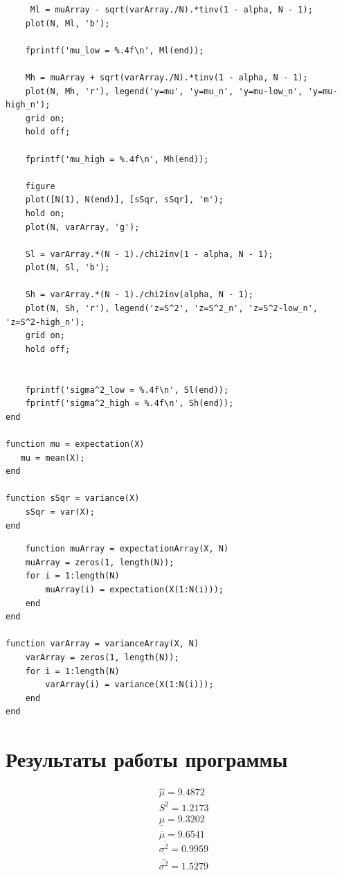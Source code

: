 \newpage
\begin{lstlisting}
     Ml = muArray - sqrt(varArray./N).*tinv(1 - alpha, N - 1);
    plot(N, Ml, 'b');

    fprintf('mu_low = %.4f\n', Ml(end));
    
    Mh = muArray + sqrt(varArray./N).*tinv(1 - alpha, N - 1);
    plot(N, Mh, 'r'), legend('y=mu', 'y=mu_n', 'y=mu-low_n', 'y=mu-high_n');
    grid on;
    hold off;
    
    fprintf('mu_high = %.4f\n', Mh(end));

    figure
    plot([N(1), N(end)], [sSqr, sSqr], 'm');
    hold on;
    plot(N, varArray, 'g');
    
    Sl = varArray.*(N - 1)./chi2inv(1 - alpha, N - 1);
    plot(N, Sl, 'b');
    
    Sh = varArray.*(N - 1)./chi2inv(alpha, N - 1);
    plot(N, Sh, 'r'), legend('z=S^2', 'z=S^2_n', 'z=S^2-low_n', 'z=S^2-high_n');
    grid on;
    hold off;

	
    fprintf('sigma^2_low = %.4f\n', Sl(end));
    fprintf('sigma^2_high = %.4f\n', Sh(end));
end

function mu = expectation(X)
   mu = mean(X);
end

function sSqr = variance(X)
    sSqr = var(X);
end
\end{lstlisting}
\newpage
\begin{lstlisting}
    function muArray = expectationArray(X, N)
    muArray = zeros(1, length(N));
    for i = 1:length(N)
        muArray(i) = expectation(X(1:N(i)));
    end
end

function varArray = varianceArray(X, N)
    varArray = zeros(1, length(N));
    for i = 1:length(N)
        varArray(i) = variance(X(1:N(i)));
    end
end
\end{lstlisting}

\section{Результаты работы программы}

\begin{equation*}
    \begin{split}
        &\hat{\mu} = 9.4872\\
        &S^2 = 1.2173\\
        &\underline{\mu} = 9.3202\\
        &\overline{\mu} = 9.6541\\
        &\underline{\sigma^2} = 0.9959\\
        &\overline{\sigma^2} = 1.5279\\
    \end{split}
\end{equation*}
\newpage

